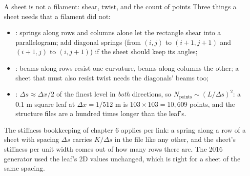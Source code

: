 \documentclass[aspectratio=169,11pt]{beamer}
\begin{document}
\begin{frame}{A sheet is not a filament: shear, twist, and the count of points}
\label{fr:sheet2}
\small Three things a sheet needs that a filament did not:
\begin{itemize}
  \item {}: springs along rows and columns alone let the rectangle shear into a parallelogram; add diagonal springs (from $(i,j)$ to $(i+1,j+1)$ and $(i+1,j)$ to $(i,j+1)$) if the sheet should keep its angles;
  \item {}: beams along rows resist one curvature, beams along columns the other; a sheet that must also resist twist needs the diagonals' beams too;
  \item {}: $\Delta s \approx \Delta x/2$ of the finest level in \emph{both} directions, so $N_{\mathrm{points}} \sim (L/\Delta s)^2$: a $0.1$ m square leaf at $\Delta x = 1/512$ m is $103\times103 = 10{,}609$ points, and the structure files are a hundred times longer than the leaf's.
\end{itemize}
\vspace{1mm}
\begin{punchbox}
\footnotesize The stiffness bookkeeping of chapter 6 applies per link: a spring along a row of a sheet with spacing $\Delta s$ carries $K/\Delta s$ in the file like any other, and the sheet's stiffness per unit width comes out of how many rows there are. The 2016 generator used the leaf's 2D values unchanged, which is right for a sheet of the same spacing.
\end{punchbox}
\end{frame}
\end{document}
